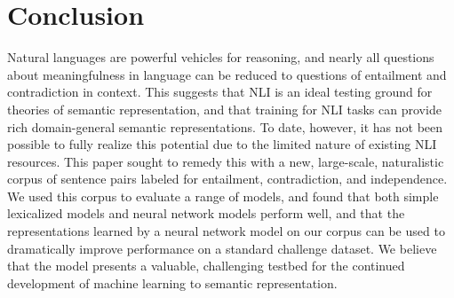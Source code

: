 \section{Conclusion}\label{sec:conclusion}

Natural languages are powerful vehicles for reasoning, 
and nearly all questions about meaningfulness
in language can be reduced to questions of entailment
and contradiction in context. This suggests that NLI is an ideal testing ground
for theories of semantic representation, and that training for NLI
tasks can provide rich domain-general semantic representations.  To
date, however, it has not been possible to fully realize this
potential due to the limited nature of existing NLI resources.  This
paper sought to remedy this with a new, large-scale, naturalistic
corpus of sentence pairs labeled for entailment, contradiction, and
independence. We used this corpus to evaluate a range of models,
and found that both simple lexicalized models and neural network
models perform well, and that the representations learned by
a neural network model on our corpus can be used to dramatically 
improve performance on a standard challenge dataset. We believe that
the model presents a valuable, challenging testbed for the continued 
development of machine learning to semantic representation.